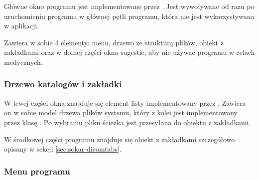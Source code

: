 \label{sec:sokar-window}

\par
Główne okno programu jest implementowane przez .
Jest wywoływane od razu po uruchomieniu programu w głównej pętli programu, która nie jest wykorzystywana w aplikacji.
\par
Zawiera w sobie 4 elementy: menu, drzewo ze strukturą plików, obiekt z zakładkami oraz w dolnej części okna sugestie, aby nie używać programu w celach medycznych.

\subsubsection{Drzewo katalogów i zakładki}

\par
W lewej części okna znajduje się element listy implementowany przez ,
Zawiera on w sobie model drzewa plików systemu, który z kolei jest implementowany przez klasę .
Po wybraniu pliku ścieżka jest przesyłana do obiektu z zakładkami.
\par
W środkowej części programu znajduje się obiekt z zakładkami szczegółowo opisany w sekcji \ref{sec:sokar-dicomtabs}.

\subsubsection{Menu programu}
\label{sec:sokar-window-menu}

